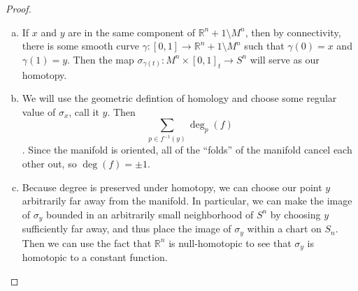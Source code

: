\documentclass{article}
\begin{document}
\begin{proof} \text{} \\
  \begin{enumerate}[(a)]
    \item If $x$ and $y$ are in the same component of
      $\mathbb{R}^n+1 \setminus M^n$, then by connectivity, there is some smooth
      curve $\gamma\colon [0, 1] \rightarrow \mathbb{R}^n+1 \setminus M^n$
      such that $\gamma(0) = x$ and $\gamma(1) = y$.
      Then the map $\sigma_{\gamma(t)}\colon M^n \times [0, 1]_t \rightarrow S^n$
      will serve as our homotopy.
    \item We will use the geometric defintion of homology and choose some
      regular value of $\sigma_x$, call it $y$. Then \[
        \sum_{p \in f^{-1}(y)} \deg_p(f)
      \]. Since the manifold is oriented, all of the ``folds'' of the manifold
      cancel each other out, so $\deg(f) = \pm 1$.
    \item Because degree is preserved under homotopy, we can choose our point
      $y$ arbitrarily far away from the manifold. In particular, we can make the
      image of $\sigma_y$ bounded in an arbitrarily small neighborhood of $S^n$
      by choosing $y$ sufficiently far away, and thus place the image of
      $\sigma_y$ within a chart on $S_n$. Then we can use the fact that
      $\mathbb{R}^n$ is null-homotopic to see that $\sigma_y$ is homotopic to a
      constant function.
  \end{enumerate}
\end{proof}
\end{document}
